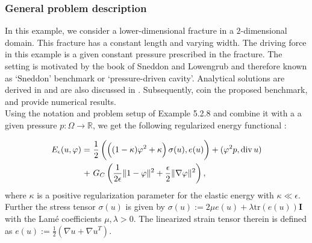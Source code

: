 \subsubsection{General problem description}

In this example, we consider a lower-dimensional fracture in a
  $2$-dimensional domain. This fracture has 
a constant length and varying width.
The driving force in this example is a given constant pressure prescribed in the fracture.
The setting is motivated by the book of Sneddon and Lowengrub
\cite{SneddLow69} and therefore known as `Sneddon' benchmark or `pressure-driven cavity'. Analytical solutions are derived in \cite{SneddLow69} and are also discussed in 
\cite{bourdin2012variational}. Subsequently, 
\cite{WeWiWo2014,HeWheWi15} coin the proposed benchmark, 
and provide numerical results.\\

Using the notation and problem setup of Example 5.2.8 and combine it with a a given pressure $p:\Omega \to \mathbb{R}$, we get the
following regularized energy functional \cite{MiWheWi19}:

\begin{align*}
\begin{aligned}
 E_{\epsilon}(u,\varphi)=&\ \frac{1}{2}\left(\left((1-\kappa)\varphi^2+\kappa\right) \sigma(u),e(u)\right)+(\varphi^2 p,\Div u)\\ +&\ G_C\left(\frac{1}{2\epsilon}\|1-\varphi\|^2 
 + \frac{\epsilon}{2}\|\nabla\varphi\|^2\right),
\end{aligned}
\end{align*}
where $\kappa$ is a positive regularization parameter for the elastic energy with $\kappa \ll \epsilon$. Further the stress tensor $\sigma(u)$ is given by $\sigma(u) := 2 \mu e(u)+ \lambda \text{tr} (e(u)) \textbf{I}$ 
with the Lam\'e coefficients $\mu,\lambda > 0$.
The linearized strain tensor therein is defined as $e(u):=\frac{1}{2} (\nabla u + \nabla u^T)$.\\


